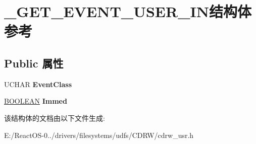 \hypertarget{struct___g_e_t___e_v_e_n_t___u_s_e_r___i_n}{}\section{\+\_\+\+G\+E\+T\+\_\+\+E\+V\+E\+N\+T\+\_\+\+U\+S\+E\+R\+\_\+\+I\+N结构体 参考}
\label{struct___g_e_t___e_v_e_n_t___u_s_e_r___i_n}
\subsection*{Public 属性}
\begin{DoxyCompactItemize}
\item 
\mbox{\label{struct___g_e_t___e_v_e_n_t___u_s_e_r___i_n_a59ff5f07c8319900bceefa4a8a3467ed}} 
U\+C\+H\+AR {\bfseries Event\+Class}
\item 
\mbox{\label{struct___g_e_t___e_v_e_n_t___u_s_e_r___i_n_a95bf6804203d2f5ae6ff5535de69acb5}} 
\hyperlink{_processor_bind_8h_a112e3146cb38b6ee95e64d85842e380a}{B\+O\+O\+L\+E\+AN} {\bfseries Immed}
\end{DoxyCompactItemize}


该结构体的文档由以下文件生成\+:\begin{DoxyCompactItemize}
\item 
E\+:/\+React\+O\+S-\/0../drivers/filesystems/udfs/\+C\+D\+R\+W/cdrw\+\_\+usr.\+h\end{DoxyCompactItemize}
